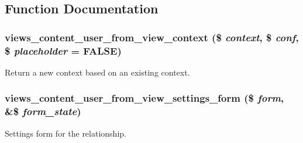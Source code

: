 \subsection{Function Documentation}
\hypertarget{user__from__view_8inc_a2eb3547ffaeeecb5f44c5e06bf48512e}{
\subsubsection[{views\_\-content\_\-user\_\-from\_\-view\_\-context}]{\setlength{\rightskip}{0pt plus 5cm}views\_\-content\_\-user\_\-from\_\-view\_\-context (\$ {\em context}, \/  \$ {\em conf}, \/  \$ {\em placeholder} = {\ttfamily FALSE})}}
\label{user__from__view_8inc_a2eb3547ffaeeecb5f44c5e06bf48512e}
Return a new context based on an existing context. \hypertarget{user__from__view_8inc_a8c17dd822c59313c8bb55e43fae9b692}{
\subsubsection[{views\_\-content\_\-user\_\-from\_\-view\_\-settings\_\-form}]{\setlength{\rightskip}{0pt plus 5cm}views\_\-content\_\-user\_\-from\_\-view\_\-settings\_\-form (\$ {\em form}, \/  \&\$ {\em form\_\-state})}}
\label{user__from__view_8inc_a8c17dd822c59313c8bb55e43fae9b692}
Settings form for the relationship. 


